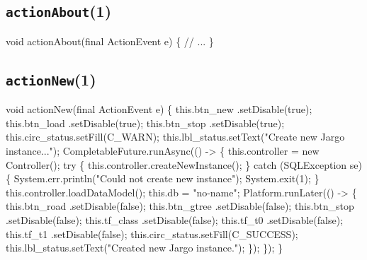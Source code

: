 \subsection{\texttt{actionAbout}(1)}
\nwenddocs{}\endmoddef{}
void actionAbout(final ActionEvent e) \{
  // ...
\}
\eatline
{}\nwendcode{}\nwdocspar
\subsection{\texttt{actionNew}(1)}
\nwenddocs{}\endmoddef{}
void actionNew(final ActionEvent e) \{
  this.btn_new      .setDisable(true);
  this.btn_load     .setDisable(true);
  this.btn_stop     .setDisable(true);
  this.circ_status.setFill(C_WARN);
  this.lbl_status.setText("Create new Jargo instance...");
  CompletableFuture.runAsync(() -> \{
    this.controller = new Controller();
    try \{
      this.controller.createNewInstance();
    \} catch (SQLException se) \{
      System.err.println("Could not create new instance");
      System.exit(1);
    \}
    this.controller.loadDataModel();
    this.db = "no-name";
    Platform.runLater(() -> \{
      this.btn_road     .setDisable(false);
      this.btn_gtree    .setDisable(false);
      this.btn_stop     .setDisable(false);
      this.tf_class     .setDisable(false);
      this.tf_t0        .setDisable(false);
      this.tf_t1        .setDisable(false);
      this.circ_status.setFill(C_SUCCESS);
      this.lbl_status.setText("Created new Jargo instance.");
    \});
  \});
\}
\eatline
{}\nwendcode{}\nwdocspar
